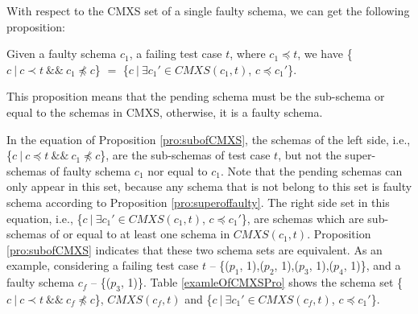\documentclass{sig-alternate-05-2015}
\begin{document}
With respect to the CMXS set of a single faulty schema, we can get the following proposition:


\begin{proposition}\label{pro:subofCMXS}
Given a faulty schema $c_{1}$, a failing test case $t$, where $c_{1} \preceq t$, we have \{$c\ |\ c \prec t\ \&\&\ c_{1} \npreceq c$\} $=$  \{$ c\ |\ \exists c_{1}' \in CMXS(c_{1}, t)$, $c \preceq c_{1}'$\}.
\end{proposition}

This proposition means that the pending schema must be the sub-schema or equal to the schemas in CMXS, otherwise, it is a faulty schema.

In the equation of Proposition \ref{pro:subofCMXS}, the schemas of the left side, i.e., \{$c\ |\ c \preceq t\ \&\&\ c_{1} \npreceq c$\}, are the sub-schemas of test case $t$, but not the super-schemas of faulty schema $c_{1}$ nor equal to $c_{1}$.  Note that the pending schemas can only appear in this set, because any schema that is not belong to this set is faulty schema according to Proposition \ref{pro:superoffaulty}. The right side set in this equation, i.e., \{$ c\ |\ \exists c_{1}' \in CMXS(c_{1}, t)$, $c \preceq c_{1}'$\}, are schemas which are sub-schemas of or equal to at least one schema in $CMXS(c_{1}, t)$. Proposition \ref{pro:subofCMXS} indicates that these two schema sets are equivalent. As an example, considering a failing test case $t$ -- \{($p_{1}$, 1),($p_{2}$, 1),($p_{3}$, 1),($p_{4}$, 1)\}, and a faulty schema $c_{f}$ --  \{($p_{3}$, 1)\}. Table \ref{examleOfCMXSPro} shows the schema set  \{$c\ |\ c \prec t\ \&\&\ c_{f} \npreceq c$\}, $CMXS(c_{f}, t)$ and \{$ c\ |\ \exists c_{1}' \in CMXS(c_{f}, t)$, $c \preceq c_{1}'$\}.
\end{document}
